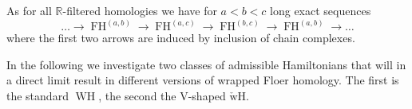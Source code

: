 \documentclass{amsart}
\newcommand{\RR}{\mathbb{R}}
\newcommand{\FH}{\operatorname{FH}}
\newcommand{\WslantH}{\operatorname{WH}}
\newcommand{\WcheckH}{\operatorname{\check wH}}
\theoremstyle{definition}
\theoremstyle{remark}
\newtheorem{remark}[proposition]{Remark}
\numberwithin{equation}{section}
\begin{document}
As for all $\RR$-filtered homologies we have for $a<b<c$ long exact sequences
\begin{equation}\label{longexact}
	\ldots\to \FH^{(a,b)}\to \FH^{(a,c)}\to \FH^{(b,c)}\to \FH^{(a,b)}\to\ldots
\end{equation}
where the first two arrows are induced by inclusion of chain complexes.


In the following we investigate two classes of admissible Hamiltonians that will in a direct limit result in different versions of wrapped Floer homology. The first is the standard $\WslantH$, the second the V-shaped $\WcheckH$.
\end{document}

